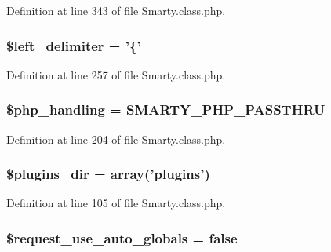 \-Definition at line 343 of file \-Smarty.\-class.\-php.

\hypertarget{class_smarty_a77e272b1cacbab4b26b4fe515e445178}{
\subsubsection[{\$left\-\_\-delimiter}]{\setlength{\rightskip}{0pt plus 5cm}\$left\-\_\-delimiter = '\{'}}\label{class_smarty_a77e272b1cacbab4b26b4fe515e445178}


\-Definition at line 257 of file \-Smarty.\-class.\-php.

\hypertarget{class_smarty_abb37c3c6b2bcb9a527c4139bffb7e6ca}{
\subsubsection[{\$php\-\_\-handling}]{\setlength{\rightskip}{0pt plus 5cm}\$php\-\_\-handling = {\bf \-S\-M\-A\-R\-T\-Y\-\_\-\-P\-H\-P\-\_\-\-P\-A\-S\-S\-T\-H\-R\-U}}}\label{class_smarty_abb37c3c6b2bcb9a527c4139bffb7e6ca}


\-Definition at line 204 of file \-Smarty.\-class.\-php.

\hypertarget{class_smarty_a5bd94212cee8bfa32df2bd9d443f30eb}{
\subsubsection[{\$plugins\-\_\-dir}]{\setlength{\rightskip}{0pt plus 5cm}\$plugins\-\_\-dir = array('plugins')}}\label{class_smarty_a5bd94212cee8bfa32df2bd9d443f30eb}


\-Definition at line 105 of file \-Smarty.\-class.\-php.

\hypertarget{class_smarty_a639bdb97701da08b49252c5dbe667930}{
\subsubsection[{\$request\-\_\-use\-\_\-auto\-\_\-globals}]{\setlength{\rightskip}{0pt plus 5cm}\$request\-\_\-use\-\_\-auto\-\_\-globals = false}}\label{class_smarty_a639bdb97701da08b49252c5dbe667930}


